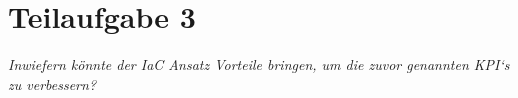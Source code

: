 \section{Teilaufgabe 3}

\textit{Inwiefern könnte der IaC Ansatz Vorteile bringen, um die zuvor genannten KPI‘s zu verbessern?}